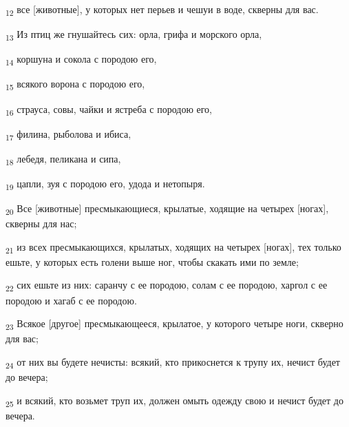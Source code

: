 \begin{tcolorbox}
\textsubscript{12} все [животные], у которых нет перьев и чешуи в воде, скверны для вас.
\end{tcolorbox}
\begin{tcolorbox}
\textsubscript{13} Из птиц же гнушайтесь сих: орла, грифа и морского орла,
\end{tcolorbox}
\begin{tcolorbox}
\textsubscript{14} коршуна и сокола с породою его,
\end{tcolorbox}
\begin{tcolorbox}
\textsubscript{15} всякого ворона с породою его,
\end{tcolorbox}
\begin{tcolorbox}
\textsubscript{16} страуса, совы, чайки и ястреба с породою его,
\end{tcolorbox}
\begin{tcolorbox}
\textsubscript{17} филина, рыболова и ибиса,
\end{tcolorbox}
\begin{tcolorbox}
\textsubscript{18} лебедя, пеликана и сипа,
\end{tcolorbox}
\begin{tcolorbox}
\textsubscript{19} цапли, зуя с породою его, удода и нетопыря.
\end{tcolorbox}
\begin{tcolorbox}
\textsubscript{20} Все [животные] пресмыкающиеся, крылатые, ходящие на четырех [ногах], скверны для нас;
\end{tcolorbox}
\begin{tcolorbox}
\textsubscript{21} из всех пресмыкающихся, крылатых, ходящих на четырех [ногах], тех только ешьте, у которых есть голени выше ног, чтобы скакать ими по земле;
\end{tcolorbox}
\begin{tcolorbox}
\textsubscript{22} сих ешьте из них: саранчу с ее породою, солам с ее породою, харгол с ее породою и хагаб с ее породою.
\end{tcolorbox}
\begin{tcolorbox}
\textsubscript{23} Всякое [другое] пресмыкающееся, крылатое, у которого четыре ноги, скверно для вас;
\end{tcolorbox}
\begin{tcolorbox}
\textsubscript{24} от них вы будете нечисты: всякий, кто прикоснется к трупу их, нечист будет до вечера;
\end{tcolorbox}
\begin{tcolorbox}
\textsubscript{25} и всякий, кто возьмет труп их, должен омыть одежду свою и нечист будет до вечера.
\end{tcolorbox}
